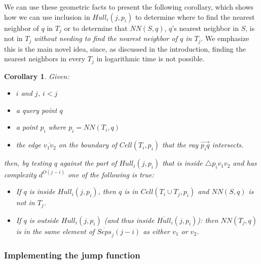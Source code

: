 \documentclass[12pt,a4paper,USenglish,cleveref, autoref, thm-restate]{article}
\newcommand{\ovar}[1]{\overrightarrow{#1}}
\newcommand{\Cell}{\mathit{Cell}}
\newcommand{\Hull}{\mathit{Hull}}
\newcommand{\NN}{\mathit{NN}}
\newtheorem{corollary}{Corollary}
\newcommand{\ovar}[1]{\overrightarrow{#1}}
\newcommand{\Cell}{\mathit{Cell}}
\newcommand{\Hull}{\mathit{Hull}}
\newcommand{\NN}{\mathit{NN}}
\newcommand{\ovar}[1]{\overrightarrow{#1}}
\newcommand{\Cell}{\mathit{Cell}}
\newcommand{\Hull}{\mathit{Hull}}
\newcommand{\NN}{\mathit{NN}}
\begin{document}
We can use these geometric facts to present the following corollary, which shows how we can use inclusion in $\Hull_i(j,p_i)$ to determine where to find the nearest neighbor of $q$ in $T_j$ or to determine that $\NN(S,q)$, $q$'s nearest neighbor in  $S$,  is not in $T_j$ \emph{without needing to find the nearest neighbor of $q$ in $T_j$}. We emphasize this is the main novel idea, since, as discussed in the introduction, finding the nearest neighbors in every $T_j$ in logarithmic time is not possible.

\begin{corollary}
    Given:
    \begin{itemize}
     \setlength{\itemsep}{1pt}
\setlength{\parskip}{0pt}
\setlength{\parsep}{0pt} 
        \item $i$ and $j$, $i<j$
        \item a query point $q$
        \item a point $p_i$ where $p_i=\NN(T_i,q)$
        \item the edge $\overline{v_1v_2}$ on the boundary of $\Cell(T_i,p_i)$ that the ray $\ovar{p_iq}$ intersects.
 \end{itemize}
 then, by testing $q$ against the part of $\Hull_i(j,p_i)$ that is inside $\triangle p_iv_1v_2$ and has complexity $d^{O(j-i)}$ one of the following is true:
\begin{itemize}
 \setlength{\itemsep}{1pt}
\setlength{\parskip}{0pt}
\setlength{\parsep}{0pt} 
\item If $q$ is inside $\Hull_i(j,p_i)$, then $q$ is in $\Cell(T_i \cup T_j,p_i)$ and $\NN(S,q)$ is not in $T_j$.
\item If $q$ is outside $\Hull_i(j,p_i)$ (and thus inside $\overline{\Hull}_i(j,p_i)$): then $\NN(T_j,q)$ is in the same element of $\overline{Seps}_j(j-i)$ as either $v_1$ or $v_2$.
\end{itemize}
\end{corollary}

\subsubsection{Implementing the jump function}
\end{document}

